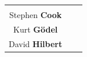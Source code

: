 \documentclass[a4paper,parskip=half*,DIV=7,fontsize=11pt]{scrartcl}
\begin{document}
\begin{adjustbox}{center}
\begin{tabular}{ccc}
\parbox[t]{5cm}{
	\begin{center}
\includegraphics[height=3cm]{img/cook.jpg}\\
	Stephen \textbf{Cook}
	\end{center}
} &
\parbox[t]{5cm}{
	\begin{center}
\includegraphics[height=3cm]{img/goedel.jpg}\\
	Kurt \textbf{Gödel}
	\end{center}
} &
\parbox[t]{5cm}{
	\begin{center}
\includegraphics[height=3cm]{img/hilbert.jpg}\\
	David \textbf{Hilbert}
	\end{center}
} \\


\end{tabular}
\end{adjustbox}
\end{document}

